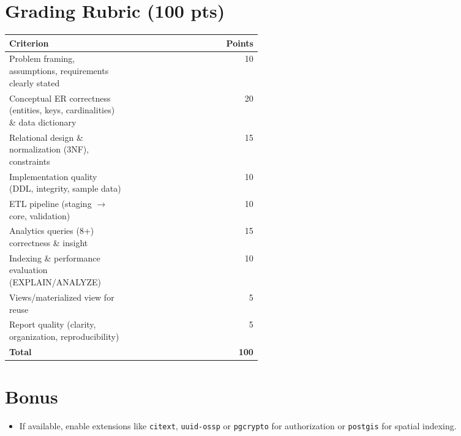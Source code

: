 \documentclass[11pt]{article}
\begin{document}
\section{Grading Rubric (100 pts)}
\begin{center}
\begin{tabular}{p{0.48\linewidth}r}
\toprule
\textbf{Criterion} & \textbf{Points} \\
\midrule
Problem framing, assumptions, requirements clearly stated & 10 \\
Conceptual ER correctness (entities, keys, cardinalities) \& data dictionary & 20 \\
Relational design \& normalization (3NF), constraints & 15 \\
Implementation quality (DDL, integrity, sample data) & 10 \\
ETL pipeline (staging $\rightarrow$ core, validation) & 10 \\
Analytics queries (8+) correctness \& insight & 15 \\
Indexing \& performance evaluation (EXPLAIN/ANALYZE) & 10 \\
Views/materialized view for reuse & 5 \\
Report quality (clarity, organization, reproducibility) & 5 \\
\midrule
\textbf{Total} & \textbf{100} \\
\bottomrule
\end{tabular}
\end{center}

%

\section{Bonus}
\begin{itemize}[leftmargin=*]
  \item If available, enable extensions like \texttt{citext}, \texttt{uuid-ossp} or \texttt{pgcrypto} for authorization or \texttt{postgis} for spatial indexing.
\end{itemize}
\end{document}
